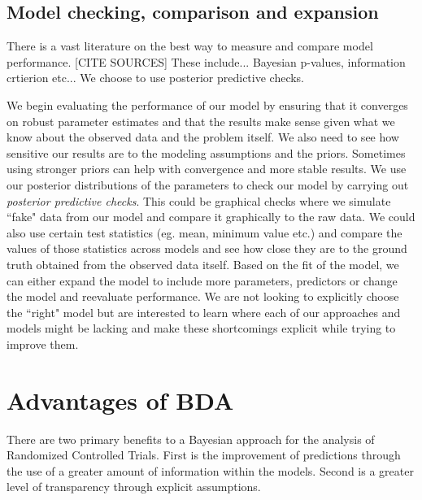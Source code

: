 \documentclass{article}
\begin{document}
\subsection{Model checking, comparison and expansion}
There is a vast literature on the best way to measure and compare model performance. [CITE SOURCES] These include... Bayesian p-values, information crtierion etc... We choose to use posterior predictive checks.

We begin evaluating the performance of our model by ensuring that it converges on robust parameter estimates and that the results make sense given what we know about the observed data and the problem itself. We also need to see how sensitive our results are to the modeling assumptions and the priors. Sometimes using stronger priors can help with convergence and more stable results. We use our posterior distributions of the parameters to check our model by carrying out \textit{posterior predictive checks}. This could be graphical checks where we simulate ``fake" data from our model and compare it graphically to the raw data. We could also use certain test statistics (eg. mean, minimum value etc.) and compare the values of those statistics across models and see how close they are to the ground truth obtained from the observed data itself. Based on the fit of the model, we can either expand the model to include more parameters, predictors or change the model and reevaluate performance. We are not looking to explicitly choose the ``right" model but are interested to learn where each of our approaches and models might be lacking and make these shortcomings explicit while trying to improve them.

\section{Advantages of BDA}
There are two primary benefits to a Bayesian approach for the analysis of Randomized Controlled Trials. First is the improvement of predictions through the use of a greater amount of information within the models. Second is a greater level of transparency through explicit assumptions. 
\end{document}
